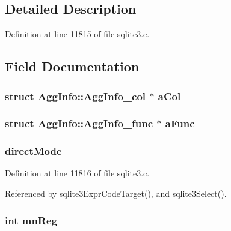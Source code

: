 \subsection{Detailed Description}


Definition at line 11815 of file sqlite3.\+c.



\subsection{Field Documentation}
\hypertarget{struct_agg_info_a8d83a14b89f4fde9637b547388ceb262}{}
\subsubsection[{a\+Col}]{\setlength{\rightskip}{0pt plus 5cm}struct {\bf Agg\+Info\+::\+Agg\+Info\+\_\+col} $\ast$ a\+Col}\label{struct_agg_info_a8d83a14b89f4fde9637b547388ceb262}
\hypertarget{struct_agg_info_a68dec2e02db37fc00b6ab1627e82d0e0}{}
\subsubsection[{a\+Func}]{\setlength{\rightskip}{0pt plus 5cm}struct {\bf Agg\+Info\+::\+Agg\+Info\+\_\+func} $\ast$ a\+Func}\label{struct_agg_info_a68dec2e02db37fc00b6ab1627e82d0e0}
\hypertarget{struct_agg_info_a4fe79eb06ac8891c5853432b666cd391}{}
\subsubsection[{direct\+Mode}]{ direct\+Mode}\label{struct_agg_info_a4fe79eb06ac8891c5853432b666cd391}


Definition at line 11816 of file sqlite3.\+c.



Referenced by sqlite3\+Expr\+Code\+Target(), and sqlite3\+Select().

\hypertarget{struct_agg_info_a7d38211c9089736ee411532f28dfb2e1}{}
\subsubsection[{mn\+Reg}]{\setlength{\rightskip}{0pt plus 5cm}int mn\+Reg}\label{struct_agg_info_a7d38211c9089736ee411532f28dfb2e1}



